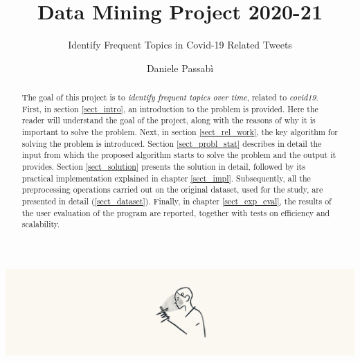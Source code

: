 \documentclass[sigconf,edbt]{acmart-edbt2021}
\begin{document}
\title{Data Mining Project 2020-21}
\subtitle{Identify Frequent Topics in Covid-19 Related Tweets}


\author{Daniele Passabì}


\begin{abstract}
  The goal of this project is to \textit{identify frequent topics over time}, related to \textit{covid19}. First, in section \ref{sect_intro}, an introduction to the problem is provided. Here the reader will understand the goal of the project, along with the reasons of why it is important to solve the problem. Next, in section \ref{sect_rel_work}, the key algorithm for solving the problem is introduced. Section \ref{sect_probl_stat} describes in detail the input from which the proposed algorithm starts to solve the problem and the output it provides. Section \ref{sect_solution} presents the solution in detail, followed by its practical implementation explained in chapter \ref{sect_impl}. Subsequently, all the preprocessing operations carried out on the original dataset, used for the study, are presented in detail (\ref{sect_dataset}). Finally, in chapter \ref{sect_exp_eval}, the results of the user evaluation of the program are reported, together with tests on efficiency and scalability.
\end{abstract}


\begin{teaserfigure}
  \includegraphics[width=\textwidth]{man_on_the_phone.png}
  \label{fig:teaser}
\end{teaserfigure}

\maketitle





\end{document}
